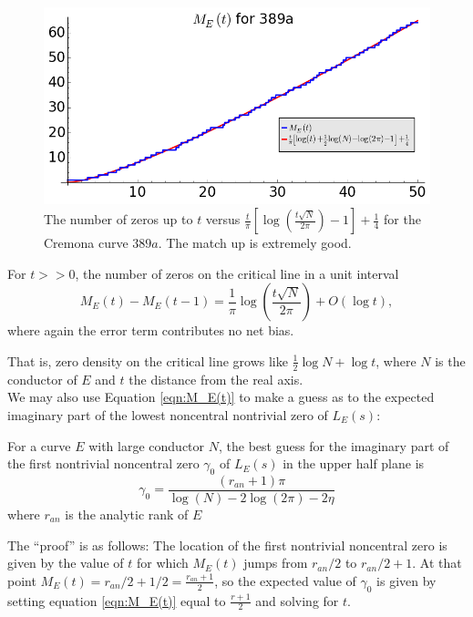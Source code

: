 \documentclass[10pt]{article}
\newcommand{\Les}{L_E(s)}
\begin{document}
\begin{figure}[!h]
    \centering
    \includegraphics[width=1.0\textwidth]{graphics/M_E_389.png}
    \caption{The number of zeros up to $t$ versus $\frac{t}{\pi}\left[\log\left(\frac{t\sqrt{N}}{2\pi}\right) -1 \right] + \frac{1}{4}$ for the Cremona curve $389a$. The match up is extremely good.}
    \label{fig:M_E_389}
\end{figure}

\begin{corollary}
For $t>>0$, the number of zeros on the critical line in a unit interval
\begin{equation}
M_E(t)-M_E(t-1) = \frac{1}{\pi}\log\left(\frac{t\sqrt{N}}{2\pi}\right) + O(\log t),
\end{equation}
where again the error term contributes no net bias.
\end{corollary}

That is, zero density on the critical line grows like $\frac{1}{2}\log N + \log t$, where $N$ is the conductor of $E$ and $t$ the distance from the real axis. \\

We may also use Equation \ref{eqn:M_E(t)} to make a guess as to the expected imaginary part of the lowest noncentral nontrivial zero of $\Les$:
\begin{proposition}
For a curve $E$ with large conductor $N$, the best guess for the imaginary part of the first nontrivial noncentral zero $\gamma_0$ of $\Les$ in the upper half plane is
\begin{equation}
\gamma_0 = \frac{(r_{an}+1)\pi}{\log(N) -2\log(2\pi) -2\eta}
\end{equation}
where $r_{an}$ is the analytic rank of $E$
\end{proposition}
The ``proof'' is as follows: The location of the first nontrivial noncentral zero is given by the value of $t$ for which $M_E(t)$ jumps from $r_{an}/2$ to $r_{an}/2+1$. At that point $M_E(t) = r_{an}/2 + 1/2 = \frac{r_{an}+1}{2}$, so the expected value of $\gamma_0$ is given by setting equation \ref{eqn:M_E(t)} equal to $\frac{r+1}{2}$ and solving for $t$. \\
\end{document}
